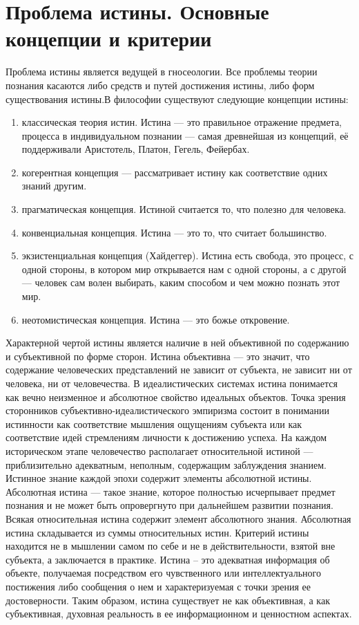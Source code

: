 \documentclass[12pt]{article}
\begin{document}
\section{Проблема истины. Основные концепции и критерии}
Проблема истины является ведущей в гносеологии. Все проблемы теории познания касаются либо средств и
путей достижения истины, либо форм существования истины.В философии существуют следующие концепции
истины:
\begin{enumerate}
\item  классическая  теория  истин.  Истина --- это  правильное  отражение  предмета,   процесса  в
индивидуальном познании --- самая древнейшая из концепций, её поддерживали  Аристотель, Платон, Гегель,
Фейербах.
\item  когерентная  концепция  ---  рассматривает  истину   как  соответствие  одних  знаний  другим.
\item прагматическая концепция. Истиной считается  то, что полезно для человека.
\item конвенциальная концепция.
Истина --- это то, что считает большинство.
\item экзистенциальная концепция (Хайдеггер). Истина есть свобода,
это процесс, с одной стороны, в котором мир открывается нам с одной стороны, а с другой --- человек сам волен
выбирать, каким способом и чем можно познать этот мир.
\item неотомистическая концепция. Истина --- это божье  
откровение.
\end{enumerate}
Характерной чертой истины является наличие в ней объективной по содержанию и субъективной
по форме сторон.
Истина объективна --- это значит, что содержание человеческих представлений не зависит  от субъекта, не
зависит  ни  от  человека,  ни  от  человечества.  В  идеалистических  системах   истина  понимается  как  вечно
неизменное  и  абсолютное  свойство  идеальных  объектов.   Точка  зрения  сторонников  субъективно-идеалистического  эмпиризма  состоит  в  понимании   истинности  как  соответствие  мышления  ощущениям
субъекта или как соответствие идей  стремлениям личности к достижению успеха. На каждом историческом
этапе человечество располагает относительной истиной --- приблизительно адекватным, неполным, содержащим
заблуждения знанием. Истинное знание каждой эпохи содержит элементы абсолютной  истины. Абсолютная
истина --- такое знание, которое полностью исчерпывает предмет познания и не может быть опровергнуто при
дальнейшем  развитии  познания.  Всякая  относительная   истина  содержит  элемент  абсолютного  знания.
Абсолютная истина складывается из суммы относительных истин. Критерий истины находится не в мышлении
самом по себе и не в действительности, взятой вне субъекта, а заключается в практике.
Истина  –  это  адекватная  информация  об  объекте,  получаемая  посредством  его  чувственного  или
интеллектуального постижения либо сообщения о нем и характеризуемая с точки зрения ее достоверности.
Таким  образом,  истина  существует  не  как  объективная,  а  как  субъективная,  духовная  реальность  в  ее
информационном и ценностном аспектах.
\end{document}

